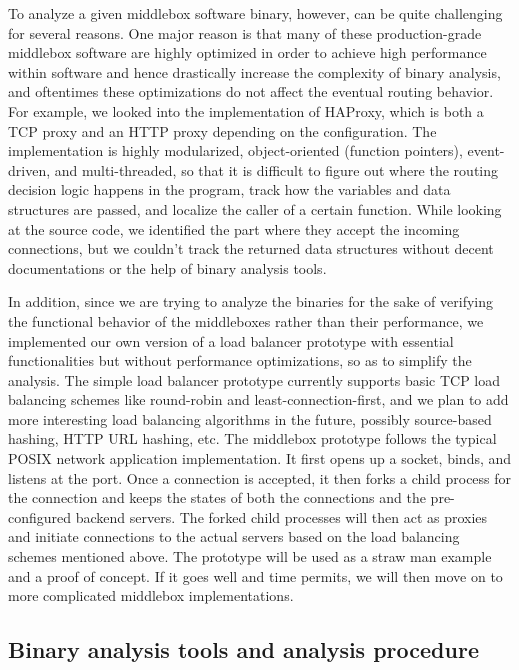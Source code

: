 To analyze a given middlebox software binary, however, can be quite challenging
for several reasons. One major reason is that many of these production-grade
middlebox software are highly optimized in order to achieve high performance
within software and hence drastically increase the complexity of binary
analysis, and oftentimes these optimizations do not affect the eventual routing
behavior. For example, we looked into the implementation of HAProxy, which is
both a TCP proxy and an HTTP proxy depending on the configuration. The
implementation is highly modularized, object-oriented (function pointers),
event-driven, and multi-threaded, so that it is difficult to figure out where
the routing decision logic happens in the program, track how the variables and
data structures are passed, and localize the caller of a certain function. While
looking at the source code, we identified the part where they accept the
incoming connections, but we couldn't track the returned data structures without
decent documentations or the help of binary analysis tools.

In addition, since we are trying to analyze the binaries for the sake of
verifying the functional behavior of the middleboxes rather than their
performance, we implemented our own version of a load balancer prototype with
essential functionalities but without performance optimizations, so as to
simplify the analysis. The simple load balancer prototype currently supports
basic TCP load balancing schemes like round-robin and least-connection-first,
and we plan to add more interesting load balancing algorithms in the future,
possibly source-based hashing, HTTP URL hashing, etc. The middlebox prototype
follows the typical POSIX network application implementation. It first opens up
a socket, binds, and listens at the port. Once a connection is accepted, it then
forks a child process for the connection and keeps the states of both the
connections and the pre-configured backend servers. The forked child processes
will then act as proxies and initiate connections to the actual servers based on
the load balancing schemes mentioned above. The prototype will be used as a
straw man example and a proof of concept. If it goes well and time permits, we
will then move on to more complicated middlebox implementations.

\subsection{Binary analysis tools and analysis procedure}

